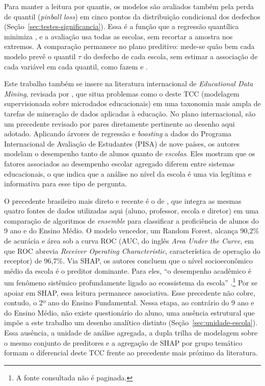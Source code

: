Para manter a leitura por quantis, os modelos são avaliados também pela
perda de quantil (\textit{pinball loss}) em cinco pontos da distribuição
condicional dos desfechos (Seção~\ref{sec:testes-significancia}). Essa é a
função que a regressão quantílica minimiza \cite{koenker2005quantile}, e a
avaliação usa todas as escolas, sem recortar a amostra nos extremos. A
comparação permanece no plano preditivo: mede-se quão bem cada modelo prevê
o quantil $\tau$ do desfecho de cada escola, sem estimar a associação de
cada variável em cada quantil, como fazem 
e .

Este trabalho também se insere na literatura internacional de
\textit{Educational Data Mining}, revisada por ,
que situa problemas como o deste TCC (modelagem supervisionada sobre
microdados educacionais) em uma taxonomia mais ampla de tarefas de
mineração de dados aplicadas à educação. No plano internacional,
 são um precedente revisado por pares
diretamente pertinente ao desenho aqui adotado. Aplicando árvores de
regressão e \textit{boosting} a dados do Programa Internacional de
Avaliação de Estudantes (PISA) de nove países, os autores modelam o
desempenho tanto de alunos quanto de \emph{escolas}. Eles mostram que os
fatores associados ao desempenho escolar agregado diferem entre sistemas
educacionais, o que indica que a análise no nível da escola é uma via
legítima e informativa para esse tipo de pergunta.

O precedente brasileiro mais direto e recente é o de
, que integra as mesmas quatro fontes
de dados utilizadas aqui (aluno, professor, escola e diretor) em uma
comparação de algoritmos de \textit{ensemble} para classificar a
proficiência de alunos do 9\textordmasculine{} ano e do Ensino Médio. O
modelo vencedor, um Random Forest, alcança 90,2\% de acurácia e área sob a
curva ROC (AUC, do inglês \textit{Area Under the Curve}, em que ROC
abrevia \textit{Receiver Operating Characteristic}, característica de
operação do receptor) de 96,7\%. Via SHAP, os autores concluem que o nível
socioeconômico médio da escola é o preditor dominante. Para eles, ``o
desempenho acadêmico é um fenômeno sistêmico profundamente ligado ao
ecossistema da escola'' \cite[tradução nossa]{tertulino2025multilevel}.\footnote{A fonte consultada não é paginada.}
Por se apoiar em SHAP, essa leitura permanece associativa. Esse precedente
não cobre, contudo, o 2º ano do Ensino Fundamental. Nessa etapa, ao
contrário do 9\textordmasculine{} ano e do Ensino Médio, não existe
questionário do aluno, uma ausência estrutural que impõe a este trabalho
um desenho analítico distinto (Seção~\ref{sec:unidade-escola}). Essa
ausência, a unidade de análise agregada, a dupla trilha de modelagem sobre
o mesmo conjunto de preditores e a agregação de SHAP por grupo temático
formam o diferencial deste TCC frente ao precedente mais
próximo da literatura.

